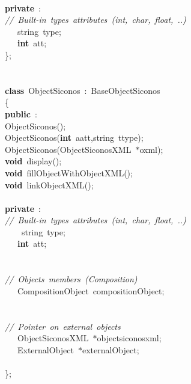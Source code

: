 {\ \\
\textbf{private}\ :\\
\textsl{//\ Built-{}in\ types\ attributes\ (int,\ char,\ float,\ ..)}\\
\ \ \ string\ type;\ \\
\ \ \ \textbf{int}\ att;\\
\};\\
\ \\
\ \\
\textbf{class}\ ObjectSiconos\ :\ BaseObjectSiconos\\
\{\\
\textbf{public}\ :\\
ObjectSiconos();\\
ObjectSiconos(\textbf{int}\ aatt,string\ ttype);\\
ObjectSiconos(ObjectSiconosXML\ $\ast$oxml);\\
\textbf{void}\ display();\\
\textbf{void}\ fillObjectWithObjectXML();\\
\textbf{void}\ linkObjectXML();\\
\ \\
\textbf{private}\ :\\
\textsl{//\ Built-{}in\ types\ attributes\ (int,\ char,\ float,\ ..)}\\
\ \ \ \ string\ type;\ \\
\ \ \ \textbf{int}\ att;\\
\ \\
\ \\
\textsl{//\ Objects\ members\ (Composition)}\\
\ \ \ CompositionObject\ compositionObject;\\
\ \\
\ \\
\textsl{//\ Pointer\ on\ external\ objects}\\
\ \ \ ObjectSiconosXML\ $\ast$objectsiconosxml;\\
\ \ \ ExternalObject\ $\ast$externalObject;\\
\ \\
\};\\
\ \\
\ \\
 }
\normalfont\normalsize

